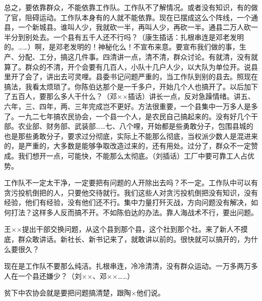 总之，要依靠群众，不能依靠工作队。工作队不了解情况。或者没有知识，有的做了官，阻碍运动。工作队本身有的人就不能依靠。现在已摆成这么个阵线，一个通县，一个新城县。谁叫人少，我就砍一半，再叫人少，再砍一半。通县二万人砍一半分到别处去。一个县有五千人还不行吗？（康生插话：扎根串连是邓老发明的。……）啊，是邓老发明的！神秘化么！不宣布来意。要宣布我们做的事，生产、分配、工分，搞这几件事。四清讲一点，清不清，群众讨论。有就清，没有就算了。群众的不清，开个会要有几百人，小队十几户人少，以大队为单位开。说县里开了会了，讲出去可灵哩。县委书记问题严重的，当工作队到别的县去。照现在搞法，我看太烦琐了。你陈伯达那个是一千多户，开始几个人也搞开了。以后加下了五百人，要那么多人干什么？（邓××插话）讲长一点，反对急躁情绪。讲五、六年，三、四年，两、三年完成岂不更好。方法很重要，一个县集中一万多人是多了。一九二七年搞农民协会，一个县一个人，是农民自己搞起来的。没有好几个干部。农业部、财务部、武装部……七、八个哩，开始都是些勇敢分子，包围县城的也是那些勇敢分子，要求过分彻底，实际上不能那么彻底，当权派少数人是混进来的，是严重的，大多数是能够争取改造过来的，还有用处。过分了，群众不一定赞成。我们想开一点，可能快，不能那么太彻底。（刘插话）工厂中要可靠工人占优势。

工作队不一定太干净，一定要把有问题的人开除出去吗？不一定。工作队中可以有贪污投机倒把的人，只要他交待就行。我们这些人对贪污投机倒把没有知识，没有经验，他们有经验，没有他们还不行。集中力量打歼灭战，方向问题没有解决，如何打法？这样多人反而搞不开。不如陈伯达的办法。靠人海战术不行，要出问题。

王××提出干部交换问题，从这个县到那个县，这个社到那个社。来了新人不摸底，群众敢讲话。新社长、新书记来了，就敢讲以前的。很快就可以搞开的，为什么要很久？

现在是工作队不要那么纯洁。扎根串连，冷冷清清，没有群众运动。一万多两万多人在一个县还嫌少？（刘××、邓××……）

贫下中农协会就是要把问题搞清楚，跟陶×他们说。

